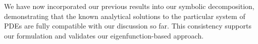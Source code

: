 \documentclass[12pt]{article}
\begin{document}
\begin{remark}
We have now incorporated our previous results into our symbolic decomposition, demonstrating that the known analytical solutions to the particular system of PDEs are fully compatible with our discussion so far. This consistency supports our formulation and validates our eigenfunction-based approach.
\end{remark}

\newpage
\end{document}

